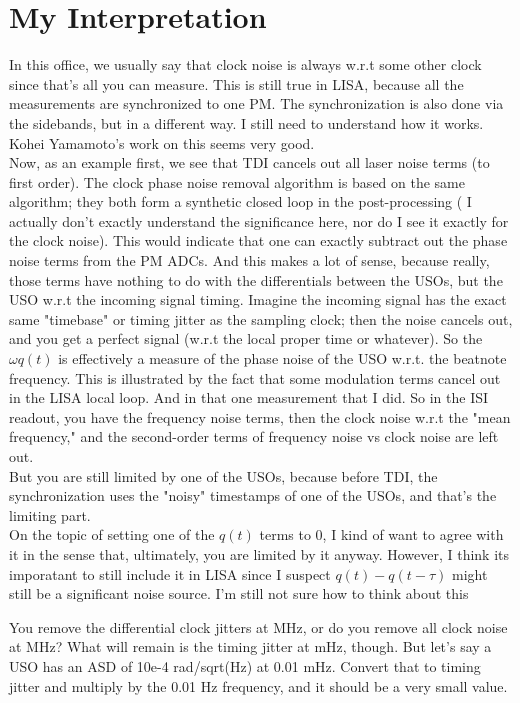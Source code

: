 \documentclass[11pt]{article}
\begin{document}
\section{My Interpretation}
In this office, we usually say that clock noise is always w.r.t some other clock since that's all you can measure. This is still true in LISA, because all the measurements are synchronized to one PM. The synchronization is also done via the sidebands, but in a different way. I still need to understand how it works. Kohei Yamamoto's work on this seems very good. \\
Now, as an example first, we see that TDI cancels out all laser noise terms (to first order). The clock phase noise removal algorithm is based on the same algorithm; they both form a synthetic closed loop in the post-processing ( I actually don't exactly understand the significance here, nor do I see it exactly for the clock noise). This would indicate that one can exactly subtract out the phase noise terms from the PM ADCs. And this makes a lot of sense, because really, those terms have nothing to do with the differentials between the USOs, but the USO w.r.t the incoming signal timing. Imagine the incoming signal has the exact same "timebase" or timing jitter as the sampling clock; then the noise cancels out, and you get a perfect signal (w.r.t the local proper time or whatever). So the $\omega q(t)$ is effectively a measure of the phase noise of the USO w.r.t. the beatnote frequency. This is illustrated by the fact that some modulation terms cancel out in the LISA local loop. And in that one measurement that I did. So in the ISI readout, you have the frequency noise terms, then the clock noise w.r.t the "mean frequency," and the second-order terms of frequency noise vs clock noise are left out.\\
But you are still limited by one of the USOs, because before TDI, the synchronization uses the "noisy" timestamps of one of the USOs, and that's the limiting part.\\
On the topic of setting one of the $q(t)$ terms to 0, I kind of want to agree with it in the sense that, ultimately, you are limited by it anyway. However, I think its imporatant to still include it in LISA since I suspect $q(t) - q(t-\tau)$ might still be a significant noise source. I'm still not sure how to think about this

You remove the differential clock jitters at MHz, or do you remove all clock noise at MHz? What will remain is the timing jitter at mHz, though. But let's say a USO has an ASD of 10e-4 rad/sqrt(Hz) at 0.01 mHz. Convert that to timing jitter and multiply by the 0.01 Hz frequency, and it should be a very small value.
\end{document}
